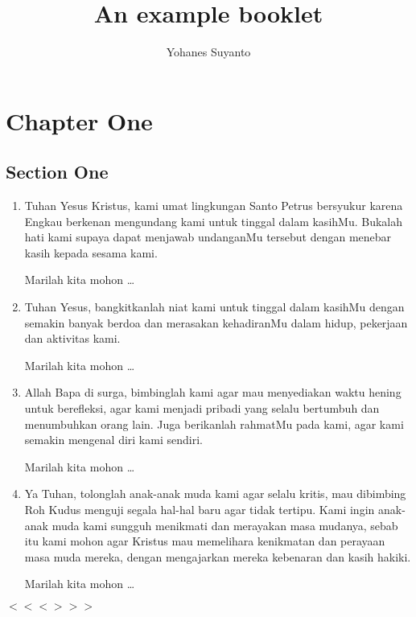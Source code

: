 \documentclass[a5paper,headsepline,titlepage,10pt,normalheadings,DIVcalc]{scrbook}
\begin{document}
\title{An example booklet}
\author{Yohanes Suyanto}
\maketitle
\tableofcontents

\chapter{Chapter One}

\section{Section One}
\onehalfspacing
\begin{Large}
\end{Large}
\begin{enumerate}
\item Tuhan Yesus Kristus, kami umat lingkungan Santo Petrus bersyukur karena Engkau berkenan mengundang kami untuk
tinggal dalam kasihMu. Bukalah hati kami supaya dapat menjawab undanganMu tersebut dengan menebar kasih
kepada sesama kami. 

Marilah kita mohon \dots

\item Tuhan Yesus, bangkitkanlah niat kami untuk tinggal dalam kasihMu dengan semakin banyak berdoa dan
merasakan kehadiranMu dalam hidup, pekerjaan dan aktivitas kami. 

Marilah kita mohon \dots

\item Allah Bapa di surga, bimbinglah kami agar mau menyediakan waktu hening untuk berefleksi, agar kami menjadi pribadi yang selalu bertumbuh dan menumbuhkan orang lain. Juga berikanlah rahmatMu pada kami, agar kami semakin mengenal diri kami sendiri. 

Marilah kita mohon \dots

\item Ya Tuhan, tolonglah anak-anak muda kami agar selalu kritis, mau dibimbing Roh Kudus
menguji segala hal-hal baru agar tidak tertipu.
Kami ingin anak-anak muda kami sungguh menikmati dan merayakan masa mudanya,
sebab itu kami mohon agar Kristus mau memelihara kenikmatan dan perayaan masa muda mereka,
dengan mengajarkan mereka kebenaran dan kasih hakiki.  

Marilah kita mohon \dots
\end{enumerate}
\begin{center}$<<<>>>$\end{center}
\end{document}
